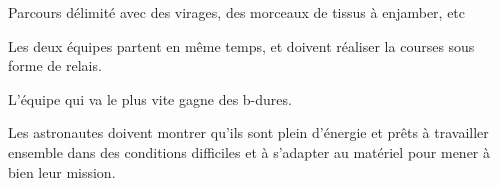 \documentclass{grand-jeu}
\begin{document}
\begin{liste-materiel}
\end{liste-materiel}

\begin{regles}
Parcours délimité avec des virages, des morceaux de tissus à enjamber, etc

Les deux équipes partent en même temps, et doivent réaliser la courses sous forme de relais.

L’équipe qui va le plus vite gagne des b-dures. 
\end{regles}

\begin{imaginaire}
Les astronautes doivent montrer qu'ils sont plein d'énergie et prêts à travailler ensemble dans des conditions difficiles et à s'adapter au matériel pour mener à bien leur mission.  
\end{imaginaire}

\begin{moments-stop}
\end{moments-stop}
\end{document}
